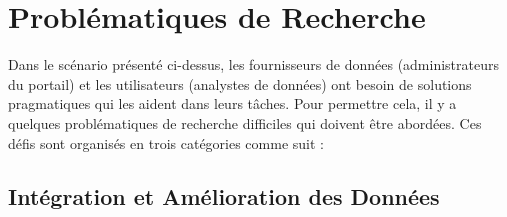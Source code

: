 \section{Probl\'{e}matiques de Recherche}

Dans le sc\'{e}nario pr\'{e}sent\'{e} ci-dessus, les fournisseurs de donn\'{e}es (administrateurs du portail) et les utilisateurs (analystes de donn\'{e}es) ont besoin de solutions pragmatiques qui les aident dans leurs t\^{a}ches. Pour permettre cela, il y a quelques probl\'{e}matiques de recherche difficiles qui doivent \^{e}tre abord\'{e}es. Ces d\'{e}fis sont organis\'{e}s en trois cat\'{e}gories comme suit :

\subsection{Int\'{e}gration et Am\'{e}lioration des Donn\'{e}es}

